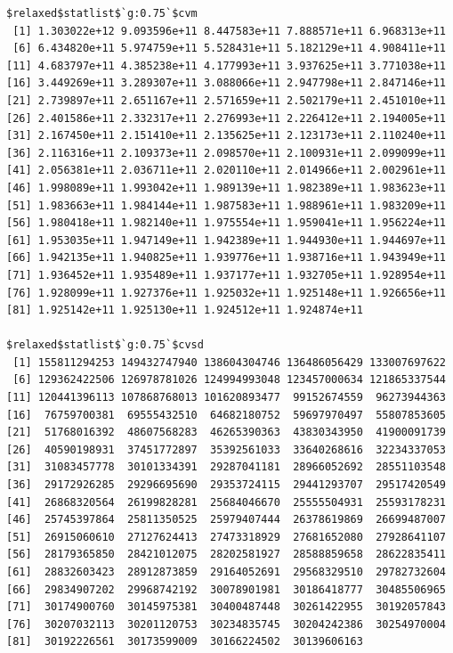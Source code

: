 \documentclass[
]{article}
\begin{document}
\begin{verbatim}
$relaxed$statlist$`g:0.75`$cvm
 [1] 1.303022e+12 9.093596e+11 8.447583e+11 7.888571e+11 6.968313e+11
 [6] 6.434820e+11 5.974759e+11 5.528431e+11 5.182129e+11 4.908411e+11
[11] 4.683797e+11 4.385238e+11 4.177993e+11 3.937625e+11 3.771038e+11
[16] 3.449269e+11 3.289307e+11 3.088066e+11 2.947798e+11 2.847146e+11
[21] 2.739897e+11 2.651167e+11 2.571659e+11 2.502179e+11 2.451010e+11
[26] 2.401586e+11 2.332317e+11 2.276993e+11 2.226412e+11 2.194005e+11
[31] 2.167450e+11 2.151410e+11 2.135625e+11 2.123173e+11 2.110240e+11
[36] 2.116316e+11 2.109373e+11 2.098570e+11 2.100931e+11 2.099099e+11
[41] 2.056381e+11 2.036711e+11 2.020110e+11 2.014966e+11 2.002961e+11
[46] 1.998089e+11 1.993042e+11 1.989139e+11 1.982389e+11 1.983623e+11
[51] 1.983663e+11 1.984144e+11 1.987583e+11 1.988961e+11 1.983209e+11
[56] 1.980418e+11 1.982140e+11 1.975554e+11 1.959041e+11 1.956224e+11
[61] 1.953035e+11 1.947149e+11 1.942389e+11 1.944930e+11 1.944697e+11
[66] 1.942135e+11 1.940825e+11 1.939776e+11 1.938716e+11 1.943949e+11
[71] 1.936452e+11 1.935489e+11 1.937177e+11 1.932705e+11 1.928954e+11
[76] 1.928099e+11 1.927376e+11 1.925032e+11 1.925148e+11 1.926656e+11
[81] 1.925142e+11 1.925130e+11 1.924512e+11 1.924874e+11

$relaxed$statlist$`g:0.75`$cvsd
 [1] 155811294253 149432747940 138604304746 136486056429 133007697622
 [6] 129362422506 126978781026 124994993048 123457000634 121865337544
[11] 120441396113 107868768013 101620893477  99152674559  96273944363
[16]  76759700381  69555432510  64682180752  59697970497  55807853605
[21]  51768016392  48607568283  46265390363  43830343950  41900091739
[26]  40590198931  37451772897  35392561033  33640268616  32234337053
[31]  31083457778  30101334391  29287041181  28966052692  28551103548
[36]  29172926285  29296695690  29353724115  29441293707  29517420549
[41]  26868320564  26199828281  25684046670  25555504931  25593178231
[46]  25745397864  25811350525  25979407444  26378619869  26699487007
[51]  26915060610  27127624413  27473318929  27681652080  27928641107
[56]  28179365850  28421012075  28202581927  28588859658  28622835411
[61]  28832603423  28912873859  29164052691  29568329510  29782732604
[66]  29834907202  29968742192  30078901981  30186418777  30485506965
[71]  30174900760  30145975381  30400487448  30261422955  30192057843
[76]  30207032113  30201120753  30234835745  30204242386  30254970004
[81]  30192226561  30173599009  30166224502  30139606163


\end{verbatim}
\end{document}
